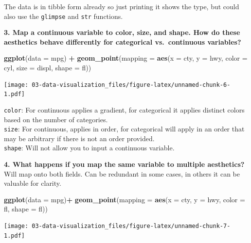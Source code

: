 \documentclass[]{book}
\newenvironment{Shaded}{\begin{snugshade}}{\end{snugshade}}
\newcommand{\DataTypeTok}[1]{\textcolor[rgb]{0.13,0.29,0.53}{#1}}
\newcommand{\KeywordTok}[1]{\textcolor[rgb]{0.13,0.29,0.53}{\textbf{#1}}}
\newcommand{\NormalTok}[1]{#1}
\newcommand{\OperatorTok}[1]{\textcolor[rgb]{0.81,0.36,0.00}{\textbf{#1}}}
\newcommand{\StringTok}[1]{\textcolor[rgb]{0.31,0.60,0.02}{#1}}
\theoremstyle{definition}
\theoremstyle{definition}
\theoremstyle{definition}
\theoremstyle{remark}
\begin{document}
The data is in tibble form already so just printing it shows the type,
but could also use the \texttt{glimpse} and \texttt{str} functions.

\textbf{3. Map a continuous variable to color, size, and shape. How do
these aesthetics behave differently for categorical vs.~continuous
variables?}

\begin{Shaded}
\begin{Highlighting}[]
\KeywordTok{ggplot}\NormalTok{(}\DataTypeTok{data =}\NormalTok{ mpg) }\OperatorTok{+}\StringTok{ }
\StringTok{  }\KeywordTok{geom_point}\NormalTok{(}\DataTypeTok{mapping =} \KeywordTok{aes}\NormalTok{(}\DataTypeTok{x =}\NormalTok{ cty, }\DataTypeTok{y =}\NormalTok{ hwy, }\DataTypeTok{color =}\NormalTok{ cyl, }\DataTypeTok{size =}\NormalTok{ displ, }\DataTypeTok{shape =}\NormalTok{ fl))}
\end{Highlighting}
\end{Shaded}

\texttt{[image: 03-data-visualization\_files/figure-latex/unnamed-chunk-6-1.pdf]}

\texttt{color}: For continuous applies a gradient, for categorical it
applies distinct colors based on the number of categories.\\
\texttt{size}: For continuous, applies in order, for categorical will
apply in an order that may be arbitrary if there is not an order
provided.\\
\texttt{shape}: Will not allow you to input a continuous variable.

\textbf{4. What happens if you map the same variable to multiple
aesthetics?}\\
Will map onto both fields. Can be redundant in some cases, in others it
can be valuable for clarity.

\begin{Shaded}
\begin{Highlighting}[]
\KeywordTok{ggplot}\NormalTok{(}\DataTypeTok{data =}\NormalTok{ mpg)}\OperatorTok{+}
\StringTok{  }\KeywordTok{geom_point}\NormalTok{(}\DataTypeTok{mapping =} \KeywordTok{aes}\NormalTok{(}\DataTypeTok{x =}\NormalTok{ cty, }\DataTypeTok{y =}\NormalTok{ hwy, }\DataTypeTok{color =}\NormalTok{ fl, }\DataTypeTok{shape =}\NormalTok{ fl))}
\end{Highlighting}
\end{Shaded}

\texttt{[image: 03-data-visualization\_files/figure-latex/unnamed-chunk-7-1.pdf]}
\end{document}
